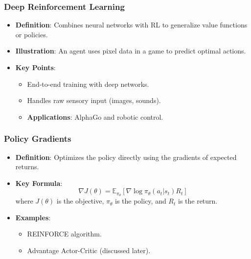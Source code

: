 \documentclass[aspectratio=169]{beamer}
\begin{document}
\begin{frame}[fragile]
    \frametitle{Deep Reinforcement Learning}
    \begin{itemize}
        \item \textbf{Definition}: Combines neural networks with RL to generalize value functions or policies.
        \item \textbf{Illustration}: An agent uses pixel data in a game to predict optimal actions.
        \item \textbf{Key Points}:
            \begin{itemize}
                \item End-to-end training with deep networks.
                \item Handles raw sensory input (images, sounds).
                \item \textbf{Applications}: AlphaGo and robotic control.
            \end{itemize}
    \end{itemize}
\end{frame}

\begin{frame}[fragile]
    \frametitle{Policy Gradients}
    \begin{itemize}
        \item \textbf{Definition}: Optimizes the policy directly using the gradients of expected returns.
        \item \textbf{Key Formula}:
        \begin{equation}
            \nabla J(\theta) = \mathbb{E}_{\pi_\theta} \left[ \nabla \log \pi_\theta(a_t | s_t) R_t \right]
        \end{equation}
        where \(J(\theta)\) is the objective, \(\pi_\theta\) is the policy, and \(R_t\) is the return.
        \item \textbf{Examples}:
            \begin{itemize}
                \item REINFORCE algorithm.
                \item Advantage Actor-Critic (discussed later).
            \end{itemize}
    \end{itemize}
\end{frame}
\end{document}
